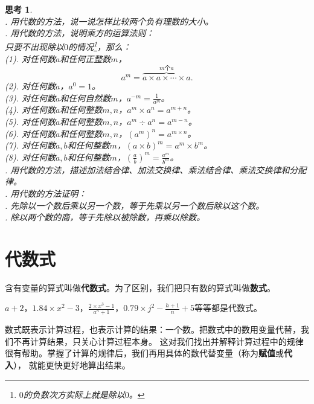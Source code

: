 \documentclass[12pt,UTF8]{ctexbook}
\theoremstyle{definition}
\theoremstyle{plain}
\newtheorem{sk}{思考}[section]
\begin{document}
\begin{sk}\label{sk:1-0-0}
    \mbox{}\\
    . 用代数的方法，说一说怎样比较两个负有理数的大小。\\
    . 用代数的方法，说明乘方的运算法则：\\
    \indent \indent 只要不出现除以$0$的情况\footnote{$0$的负数次方实际上就是除以$0$。}，那么：\\
    \indent \indent (1). 对任何数$a$和任何正整数$m$，
    $$a^m = \overbrace{a\times a \times \cdots \times a}^{m\text{个}a}.$$
    \indent \indent (2). 对任何数$a$，$a^0 = 1$。\\
    \indent \indent (3). 对任何数$a$和任何自然数$m$，$a^{-m} = \frac{1}{a^m}$。\\
    \indent \indent (4). 对任何数$a$和任何整数$m,n$，$a^m \times a^n = a^{m+n}$。\\
    \indent \indent (5). 对任何数$a$和任何整数$m,n$，$a^m \div a^n = a^{m-n}$。\\
    \indent \indent (6). 对任何数$a$和任何整数$m,n$，$\left(a^m\right)^n = a^{m\times n}$。\\
    \indent \indent (7). 对任何数$a,b$和任何整数$m$，$(a\times b)^m = a^m \times b^m$。\\
    \indent \indent (8). 对任何数$a,b$和任何整数$m$，$\left(\frac{a}{b}\right)^m = \frac{a^m}{b^m}$。\\
    . 用代数的方法，描述加法结合律、加法交换律、乘法结合律、乘法交换律和分配律。\\
    . 用代数的方法证明：\\
    . 先除以一个数后乘以另一个数，等于先乘以另一个数后除以这个数。\\
    . 除以两个数的商，等于先除以被除数，再乘以除数。\\
\end{sk}

\section{代数式}
含有变量的算式叫做\textbf{代数式}。为了区别，我们把只有数的算式叫做\textbf{数式}。

$a + 2$，$1.84\times x^2 - 3$，$\frac{2\times x^3 - 1}{a^n + 1}$，$0.79\times  j^2 - \frac{h+1}{n} + 5 $等等都是代数式。

数式既表示计算过程，也表示计算的结果：一个数。把数式中的数用变量代替，我们不再计算结果，只关心计算过程本身。
这对我们找出并解释计算过程中的规律很有帮助。掌握了计算的规律后，我们再用具体的数代替变量（称为\textbf{赋值}或\textbf{代入}），
就能更快更好地算出结果。
\end{document}
